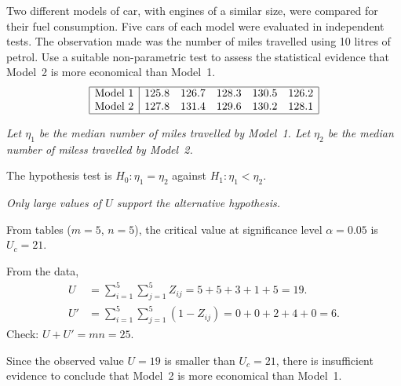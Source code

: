 \begin{example}\label{ex:mannwhitney}
Two different models of car, with engines of a similar size, were compared for their fuel consumption. Five cars of each model were evaluated in independent tests. The observation made was the number of miles travelled using 10 litres of petrol. Use a suitable non-parametric test to assess the statistical evidence that Model~2 is more economical than Model~1.
\[\begin{array}{|l|ccccc|}\hline
\text{Model 1}	& 125.8	& 126.7	& 128.3	& 130.5	& 126.2 \\
\text{Model 2}	& 127.8 & 131.4	& 129.6	& 130.2	& 128.1 \\ \hline
\end{array}\]
\end{example}

\begin{solution}
\bit
\it Let $\eta_1$ be the median number of miles travelled by Model~1.
\it Let $\eta_2$ be the median number of miless travelled by Model~2.
\eit
\par
The hypothesis test is $H_0:\eta_1=\eta_2$ against $H_1:\eta_1 < \eta_2$.

\bit
\it Only large values of $U$ support the alternative hypothesis. 
\eit
\par 
From tables ($m=5$, $n=5$), the critical value at significance level $\alpha=0.05$ is $U_c=21$. 
\par
From the data,
\begin{align*}
U 		& = \sum_{i=1}^5\sum_{j=1}^5 Z_{ij} = 5 + 5 + 3 + 1 + 5 = 19. \\
U'		& = \sum_{i=1}^5\sum_{j=1}^5 (1-Z_{ij}) = 0 + 0 + 2 + 4 + 0 = 6.
\end{align*}
Check: $U + U' = mn = 25$. 
\par
Since the observed value $U=19$ is smaller than $U_c=21$, there is insufficient evidence to conclude that Model~2 is more economical than Model~1. 

\end{solution}

